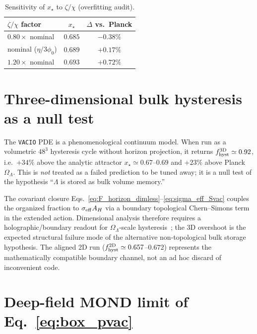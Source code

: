 \documentclass[prd,
               reprint,
               aps,
               preprintnumbers,
               nofootinbib,
               longbibliography,
               floatfix]{revtex4-2}
\begin{document}
\begin{table}[h]
\footnotesize
\caption{Sensitivity of $x_\star$ to $\zeta/\chi$ (overfitting audit).}
\label{tab:overfit_audit}
\begin{ruledtabular}
\begin{tabular}{lcc}
$\zeta/\chi$ factor & $x_\star$ & $\Delta$ vs.\ Planck \\
\hline
$0.80\times$ nominal & $0.685$ & $-0.38\%$ \\
nominal ($\eta/3\phi_0$) & $0.689$ & $+0.17\%$ \\
$1.20\times$ nominal & $0.693$ & $+0.72\%$ \\
\end{tabular}
\end{ruledtabular}
\end{table}

\section{Three-dimensional bulk hysteresis as a null test}
\label{app:3d_null}

The \texttt{VACIO} PDE is a phenomenological continuum model.
When run as a volumetric $48^3$ hysteresis cycle without horizon
projection, it returns $f_{\rm hyst}^{\rm 3D}\simeq 0.92$, i.e.\
$+34\%$ above the analytic attractor $x_\star\simeq 0.67$--$0.69$
and $+23\%$ above Planck $\Omega_\Lambda$.
This is \emph{not} treated as a failed prediction to be tuned away; it
is a null test of the hypothesis ``$\Lambda$ is stored as bulk volume
memory.''

The covariant closure 
Eqs.~\eqref{eq:F_horizon_dimless}--\eqref{eq:sigma_eff_Svac}
couples the organized fraction to $\sigma_{\rm eff}A_H$ via 
a boundary topological Chern--Simons term in the 
extended action. Dimensional analysis therefore 
requires a holographic/boundary readout for 
$\Omega_\Lambda$-scale hysteresis~\cite{tHooft1993,Bousso2002}; 
the 3D overshoot is the expected structural failure mode 
of the alternative non-topological bulk storage hypothesis.
The aligned 2D run ($f_{\rm hyst}^{\rm 2D}\simeq 0.657$--$0.672$) 
represents the mathematically compatible boundary channel, 
not an ad hoc discard of inconvenient code.


\section{Deep-field MOND limit of Eq.~\texorpdfstring{\eqref{eq:box_pvac}}{18}}
\label{app:mond_limit}
\end{document}
